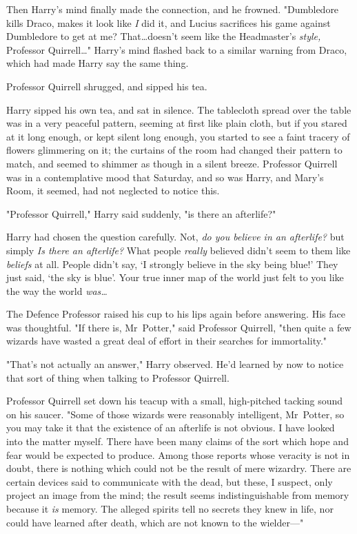 Then Harry's mind finally made the connection, and he frowned. "Dumbledore
kills Draco, makes it look like \emph{I} did it, and Lucius sacrifices his game
against Dumbledore to get at me? That…doesn't seem like the
Headmaster's \emph{style,} Professor Quirrell…" Harry's mind flashed
back to a similar warning from Draco, which had made Harry say the same thing.

Professor Quirrell shrugged, and sipped his tea.

Harry sipped his own tea, and sat in silence. The tablecloth spread over the
table was in a very peaceful pattern, seeming at first like plain cloth, but if
you stared at it long enough, or kept silent long enough, you started to see a
faint tracery of flowers glimmering on it; the curtains of the room had changed
their pattern to match, and seemed to shimmer as though in a silent breeze.
Professor Quirrell was in a contemplative mood that Saturday, and so was Harry,
and Mary's Room, it seemed, had not neglected to notice this.

"Professor Quirrell," Harry said suddenly, "is there an afterlife?"

Harry had chosen the question carefully. Not, \emph{do you believe in an
afterlife?} but simply \emph{Is there an afterlife?} What people \emph{really}
believed didn't seem to them like \emph{beliefs} at all. People didn't say, `I
strongly believe in the sky being blue!' They just said, `the sky is blue'.
Your true inner map of the world just felt to you like the way the world
\emph{was…}

The Defence Professor raised his cup to his lips again before answering. His
face was thoughtful. "If there is, Mr~Potter," said Professor Quirrell, "then
quite a few wizards have wasted a great deal of effort in their searches for
immortality."

"That's not actually an answer," Harry observed. He'd learned by now to notice
that sort of thing when talking to Professor Quirrell.

Professor Quirrell set down his teacup with a small, high-pitched tacking sound
on his saucer. "Some of those wizards were reasonably intelligent, Mr~Potter,
so you may take it that the existence of an afterlife is not obvious. I have
looked into the matter myself. There have been many claims of the sort which
hope and fear would be expected to produce. Among those reports whose veracity
is not in doubt, there is nothing which could not be the result of mere
wizardry. There are certain devices said to communicate with the dead, but
these, I suspect, only project an image from the mind; the result seems
indistinguishable from memory because it \emph{is} memory. The alleged spirits
tell no secrets they knew in life, nor could have learned after death, which
are not known to the wielder---"

